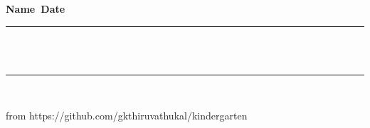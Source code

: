 \documentclass{article.cls}
\begin{document}
{\bf Name\ \underline{\hskip 200pt}\hskip 130pt}{\bf Date\
\underline{\hskip 150pt}}

\vskip 1cm

{
\vskip 10pt


\rule[1.75ex]{7.5in}{1pt}

\\
\hdashrule{7.75in}{1pt}{4mm}
\\
\rule[-1.75ex]{7.5in}{1pt}
\\
}

\vskip 1cm

from https://github.com/gkthiruvathukal/kindergarten
\end{document}
